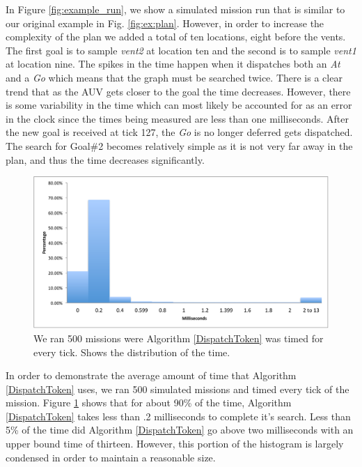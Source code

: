 In Figure \ref{fig:example_run}, we show a simulated mission run that is similar to our original example in Fig. \ref{fig:ex:plan}.
However, in order to increase the complexity of the plan we added a total of ten locations, eight before the vents. The first goal 
is to sample {\em vent2} at location ten and the second is to sample {\em vent1} at location nine. The spikes in the time 
happen when it dispatches both an {\em At} and a {\em Go} which means that the graph must be searched twice. There
is a clear trend that as the AUV gets closer to the goal the time decreases. However, there is some variability in the time which
can most likely be accounted for as an error in the clock since the times being measured are less than one milliseconds. 
After the new goal is received at tick 127, the {\em Go} is no longer deferred gets dispatched. The search for Goal\#2 becomes 
relatively simple as it is not very far away in the plan, and thus the time decreases significantly.

\begin{figure}
\centering
\includegraphics[width=\columnwidth]{figs/HistogramAlg1}
\caption{\small  We ran 500 missions were Algorithm \ref{DispatchToken} was timed for every tick. Shows the
   distribution of the time.} 
  \label{fig:histogram}
\end{figure}

In order to demonstrate the average amount of time that Algorithm \ref{DispatchToken} uses, we ran 500 simulated missions
and timed every tick of the mission. Figure \ref{fig:histogram} shows that for about 90\% of the time, Algorithm \ref{DispatchToken}
takes less than .2 milliseconds to complete it's search. Less than 5\% of the time did Algorithm \ref{DispatchToken} go above
two milliseconds with an upper bound time of thirteen. However, this portion of the histogram is largely condensed in 
order to maintain a reasonable size.   





